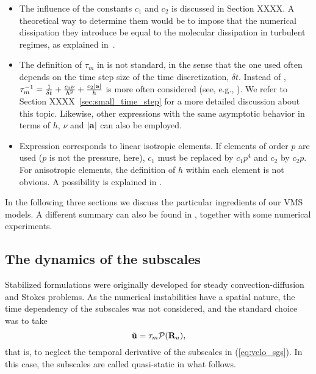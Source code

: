 \begin{itemize}
\item The influence of the constants $c_1$ and $c_2$ is discussed in Section XXXX. A theoretical way to determine them would be to impose that the numerical dissipation they introduce be equal to the molecular dissipation in turbulent regimes, as explained in~\cite{guasch-codina-13}. 
\item The definition of $\tau_m$ in  is not standard, in the sense that the one used often depends on the time step size of the time discretization, $\delta t$. Instead of , $\tau_m^{-1}=\frac{1}{\delta t} + \frac{c_1\nu}{h^2}+\frac{c_2|{\bf a}|}{h}$ is more often considered (see, e.g., \cite{Hsu2010,gamnitzer_time-dependent_2010}). We refer to 
Section XXXX~\ref{sec:small_time_step} for a more detailed discussion about this topic. Likewise, other expressions with the same asymptotic behavior in terms of $h$, $\nu$ and $|{\bf a}|$ can also be employed.
\item Expression  corresponds to linear isotropic elements. If elements of order $p$ are used ($p$ is not the pressure, here), $c_1$ must be replaced by $c_1 p^4$ and $c_2$ by $c_2 p$. For anisotropic elements, the definition of $h$ within each element is not obvious. A possibility is explained in \cite{Principe2010}.
\end{itemize}

In the following three sections we discuss the particular ingredients of our VMS models. A different summary can also be found in \cite{Codina-chap-2011}, together with some numerical experiments. 

\subsection{The dynamics of the subscales}
Stabilized formulations were originally developed for steady convection-diffusion \cite{Brooks_1982} and Stokes \cite{Douglas_1989,Hughes_1986_5} problems. As the numerical instabilities have a spatial nature, the time dependency of the subscales was not considered, and the standard choice \cite{Hughes2000,hughes_large_2001,bazilevs_variational_2007} was to take 
\begin{equation}
\label{eq-static_sgs}
\tilde{{\bf u}}=\tau_m \mathcal{P}({\bf R}_u),
\end{equation}
that is, to neglect the temporal derivative of the subscales in (\ref{eq:velo_sgs}). In this case, the subscales are called quasi-static in what follows.

